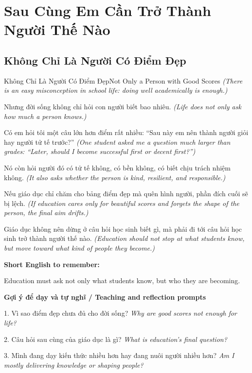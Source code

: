 \chapter{Sau Cùng Em Cần Trở Thành Người Thế Nào}

\section{Không Chỉ Là Người Có Điểm Đẹp}
\begin{truyen}{Không Chỉ Là Người Có Điểm Đẹp}{Not Only a Person with Good Scores}
\textit{(There is an easy misconception in school life: doing well academically is enough.)}

Nhưng đời sống không chỉ hỏi con người biết bao nhiêu.
\textit{(Life does not only ask how much a person knows.)}

Có em hỏi tôi một câu lớn hơn điểm rất nhiều: “Sau này em nên thành người giỏi hay người tử tế trước?”
\textit{(One student asked me a question much larger than grades: “Later, should I become successful first or decent first?”)}

Nó còn hỏi người đó có tử tế không, có bền không, có biết chịu trách nhiệm không.
\textit{(It also asks whether the person is kind, resilient, and responsible.)}

Nếu giáo dục chỉ chăm cho bảng điểm đẹp mà quên hình người, phần đích cuối sẽ bị lệch.
\textit{(If education cares only for beautiful scores and forgets the shape of the person, the final aim drifts.)}

\end{truyen}

\begin{baihoc}
Giáo dục không nên dừng ở câu hỏi học sinh biết gì, mà phải đi tới câu hỏi học sinh trở thành người thế nào.
\textit{(Education should not stop at what students know, but move toward what kind of people they become.)}
\end{baihoc}

\begin{ghinhoanh}
\textbf{Short English to remember:}

Education must ask not only what students know, but who they are becoming.

\end{ghinhoanh}

\begin{tuhocnhanh}
\textbf{Gợi ý để dạy và tự nghĩ / Teaching and reflection prompts}

1. Vì sao điểm đẹp chưa đủ cho đời sống? \textit{Why are good scores not enough for life?}

2. Câu hỏi sau cùng của giáo dục là gì? \textit{What is education's final question?}

3. Mình đang dạy kiến thức nhiều hơn hay đang nuôi người nhiều hơn? \textit{Am I mostly delivering knowledge or shaping people?}
\end{tuhocnhanh}
\ngancach

